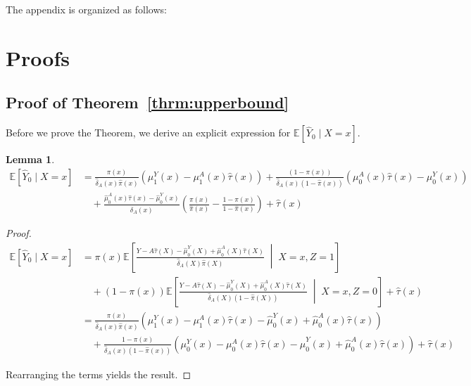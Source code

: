 \documentclass[nonatbib]{article}
\newcommand{\E}{\mathbb{E}}
\theoremstyle{definition}
\theoremstyle{plain}
\newtheorem{lemma}{Lemma}
\begin{document}
\appendix

The appendix is organized as follows:

\section{Proofs}\label{app:proofs}

\subsection{Proof of Theorem~\ref{thrm:upperbound}}
Before we prove the Theorem, we derive an explicit expression for $\E[\hat{Y}_0 \mid X=x]$.
\begin{lemma}\label{lem:second_stage}
\begin{equation}
\begin{split}
    \E[\hat{Y}_0 \mid X=x] &= 
   \frac{\pi(x)}{\hat{\delta}_A(x) \hat{\pi}(x)} \left(\mu_1^Y(x) - \mu_1^A(x)\hat{\tau}(x)\right)
   + \frac{(1-\pi(x))}{\hat{\delta}_A(x)(1 - \hat{\pi}(x))} \left(\mu_0^A(x) \hat{\tau}(x) -\mu_0^Y(x) \right)\\ & \quad + 
   \frac{\hat{\mu}_0^A(x) \hat{\tau}(x) - \hat{\mu}_0^Y (x)}{\hat{\delta}_A(x)} \left(\frac{\pi(x)}{\hat{\pi}(x)} - \frac{1- \pi(x)}{1-\hat{\pi}(x)} \right) + \hat{\tau}(x)   
\end{split}
\end{equation}
\end{lemma}

\begin{proof}
\begin{align}
 \E[\hat{Y}_0 \mid X=x] &= \pi(x) \E\left[ \frac{Y - A \hat{\tau}(X) - \hat{\mu}_0^Y(X) + \hat{\mu}_0^A(X) \hat{\tau}(X)}{\hat{\delta}_A(X) \hat{\pi}(X)} \; \middle| \; X = x, Z = 1\right] \\ 
 & \quad + (1 - \pi(x)) \E\left[ \frac{Y - A \hat{\tau}(X) - \hat{\mu}_0^Y(X) + \hat{\mu}_0^A(X) \hat{\tau}(X)}{\hat{\delta}_A(X) (1 - \hat{\pi}(X))} \; \middle| \; X = x, Z = 0\right] + \hat{\tau}(x)\\
 & = \frac{\pi(x)}{\hat{\delta}_A(x) \hat{\pi}(x)} \left( \mu_1^Y(x) - \mu_1^A(x)\hat{\tau}(x) - \hat{\mu}_0^Y(x) + \hat{\mu}_0^A(x)\hat{\tau}(x) \right) \\
 & \quad + \frac{1-\pi(x)}{\hat{\delta}_A(x) (1-\hat{\pi}(x))} \left(\mu_0^Y(x) - \mu_0^A(x)\hat{\tau}(x) - \hat{\mu}_0^Y(x) + \hat{\mu}_0^A(x)\hat{\tau}(x) \right) + \hat{\tau}(x)
\end{align}

Rearranging the terms yields the result.
\end{proof}
\end{document}
